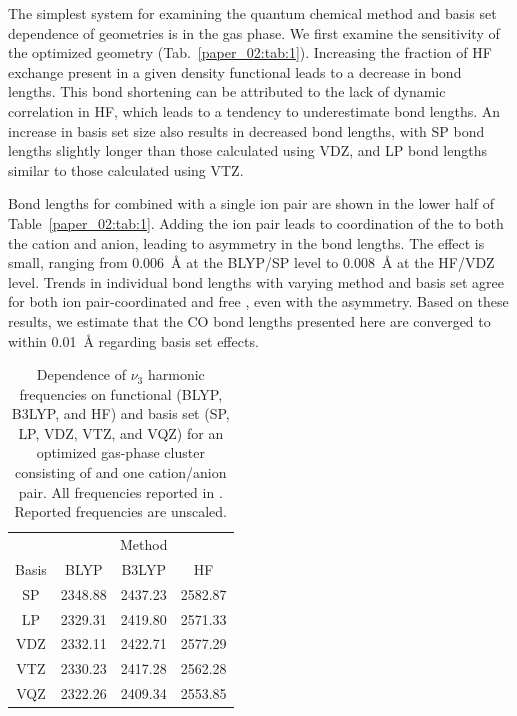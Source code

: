 The simplest system for examining the quantum chemical method and basis set dependence of geometries is  in the gas phase. We first examine the sensitivity of the optimized geometry (Tab.~\ref{paper_02:tab:1}). Increasing the fraction of HF exchange present in a given density functional leads to a decrease in bond lengths. This bond shortening can be attributed to the lack of dynamic correlation in HF, which leads to a tendency to underestimate bond lengths. An increase in basis set size also results in decreased bond lengths, with SP bond lengths slightly longer than those calculated using VDZ, and LP bond lengths similar to those calculated using VTZ.

Bond lengths for  combined with a single ion pair are shown in the lower half of Table~\ref{paper_02:tab:1}. Adding the ion pair leads to coordination of the  to both the cation and anion, leading to asymmetry in the  bond lengths. The effect is small, ranging from \SI{0.006}{\angstrom} at the BLYP/SP level to \SI{0.008}{\angstrom} at the HF/VDZ level. Trends in individual  bond lengths with varying method and basis set agree for both ion pair-coordinated  and free , even with the asymmetry. Based on these results, we estimate that the CO bond lengths presented here are converged to within \SI{0.01}{\angstrom} regarding basis set effects.

\begin{table}
  \centering
  \caption[Functional and basis set dependence of \texorpdfstring{ \(\nu_3\)}{carbon dioxide asymmetric stretch} frequencies]{Dependence of \(\nu_3\) harmonic frequencies on functional (BLYP, B3LYP, and HF) and basis set (SP, LP, VDZ, VTZ, and VQZ) for an optimized gas-phase cluster consisting of  and one cation/anion pair. All frequencies reported in \si{\wavenumber}. Reported frequencies are unscaled.}
  \label{paper_02:tab:2}
  \begin{tabular}{cccc}
    \toprule
    & \multicolumn{3}{c}{Method} \\
    Basis & BLYP & B3LYP & HF \\
    \midrule
    SP & 2348.88 & 2437.23 & 2582.87 \\
    LP & 2329.31 & 2419.80 & 2571.33 \\
    VDZ & 2332.11 & 2422.71 & 2577.29 \\
    VTZ & 2330.23 & 2417.28 & 2562.28 \\
    VQZ & 2322.26 & 2409.34 & 2553.85 \\
    \bottomrule
  \end{tabular}
\end{table}

